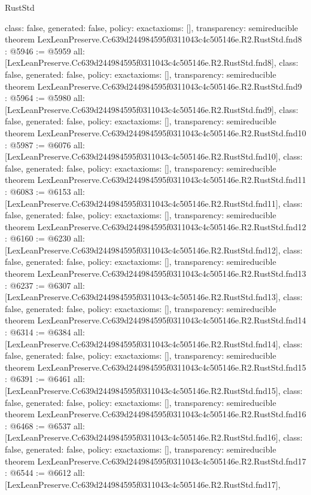 \begin{lexlean}{RustStd}
\begin{coremodule}
{  class: false,
  generated: false,
  policy: exact{axioms: []},
  transparency: semireducible
}
theorem LexLeanPreserve.Cc639d244984595f0311043c4c505146e.R2.RustStd.fnd8 : @5946 := @5959 {
  all: [LexLeanPreserve.Cc639d244984595f0311043c4c505146e.R2.RustStd.fnd8],
  class: false,
  generated: false,
  policy: exact{axioms: []},
  transparency: semireducible
}
theorem LexLeanPreserve.Cc639d244984595f0311043c4c505146e.R2.RustStd.fnd9 : @5964 := @5980 {
  all: [LexLeanPreserve.Cc639d244984595f0311043c4c505146e.R2.RustStd.fnd9],
  class: false,
  generated: false,
  policy: exact{axioms: []},
  transparency: semireducible
}
theorem LexLeanPreserve.Cc639d244984595f0311043c4c505146e.R2.RustStd.fnd10 : @5987 := @6076 {
  all: [LexLeanPreserve.Cc639d244984595f0311043c4c505146e.R2.RustStd.fnd10],
  class: false,
  generated: false,
  policy: exact{axioms: []},
  transparency: semireducible
}
theorem LexLeanPreserve.Cc639d244984595f0311043c4c505146e.R2.RustStd.fnd11 : @6083 := @6153 {
  all: [LexLeanPreserve.Cc639d244984595f0311043c4c505146e.R2.RustStd.fnd11],
  class: false,
  generated: false,
  policy: exact{axioms: []},
  transparency: semireducible
}
theorem LexLeanPreserve.Cc639d244984595f0311043c4c505146e.R2.RustStd.fnd12 : @6160 := @6230 {
  all: [LexLeanPreserve.Cc639d244984595f0311043c4c505146e.R2.RustStd.fnd12],
  class: false,
  generated: false,
  policy: exact{axioms: []},
  transparency: semireducible
}
theorem LexLeanPreserve.Cc639d244984595f0311043c4c505146e.R2.RustStd.fnd13 : @6237 := @6307 {
  all: [LexLeanPreserve.Cc639d244984595f0311043c4c505146e.R2.RustStd.fnd13],
  class: false,
  generated: false,
  policy: exact{axioms: []},
  transparency: semireducible
}
theorem LexLeanPreserve.Cc639d244984595f0311043c4c505146e.R2.RustStd.fnd14 : @6314 := @6384 {
  all: [LexLeanPreserve.Cc639d244984595f0311043c4c505146e.R2.RustStd.fnd14],
  class: false,
  generated: false,
  policy: exact{axioms: []},
  transparency: semireducible
}
theorem LexLeanPreserve.Cc639d244984595f0311043c4c505146e.R2.RustStd.fnd15 : @6391 := @6461 {
  all: [LexLeanPreserve.Cc639d244984595f0311043c4c505146e.R2.RustStd.fnd15],
  class: false,
  generated: false,
  policy: exact{axioms: []},
  transparency: semireducible
}
theorem LexLeanPreserve.Cc639d244984595f0311043c4c505146e.R2.RustStd.fnd16 : @6468 := @6537 {
  all: [LexLeanPreserve.Cc639d244984595f0311043c4c505146e.R2.RustStd.fnd16],
  class: false,
  generated: false,
  policy: exact{axioms: []},
  transparency: semireducible
}
theorem LexLeanPreserve.Cc639d244984595f0311043c4c505146e.R2.RustStd.fnd17 : @6544 := @6612 {
  all: [LexLeanPreserve.Cc639d244984595f0311043c4c505146e.R2.RustStd.fnd17],
}
\end{coremodule}
\end{lexlean}
